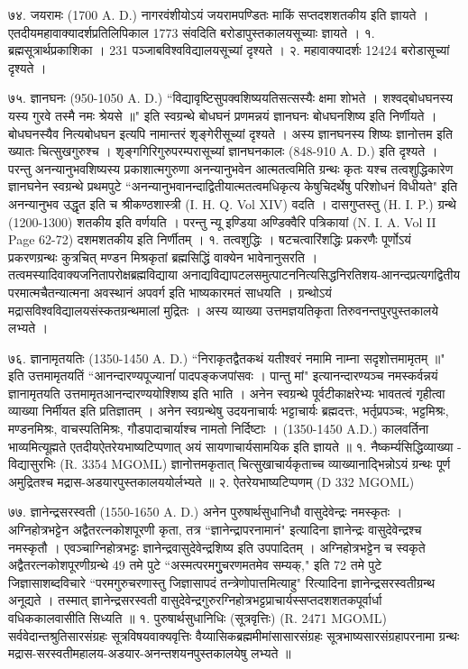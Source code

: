 ७४. जयरामः (1700 A. D.)
नागरवंशीयोऽयं जयरामपण्डितः माकिं सप्तदशशतकीय इति ज्ञायते । एतदीयमहावाक्यादर्शप्रतिलिपिकाल 1773 संवदिति बरोडापुस्तकालयसूच्याः ज्ञायते ।
१. ब्रह्मसूत्रार्थप्रकाशिका । 231 पञ्जाबविश्वविद्यालयसूच्यां दृश्यते ।
२. महावाक्यादर्शः 12424 बरोडासूच्यां दृश्यते ।

७५. ज्ञानघनः (950-1050 A. D.)
``विद्यावृष्टिसुपक्वशिष्ययतिसत्सस्यैः क्षमा शोभते ।
शश्वद्बोधघनस्य यस्य गुरवे तस्मै नमः श्रेयसे ॥"
इति स्वग्रन्थे बोधघनं प्रणमन्नयं ज्ञानघनः बोधघनशिष्य इति निर्णीयते । बोधघनस्यैव नित्यबोधघन इत्यपि नामान्तरं शृङ्गेरीसूच्यां दृश्यते । अस्य ज्ञानघनस्य शिष्यः ज्ञानोत्तम इति ख्यातः चित्सुखगुरुश्च । शृङ्गगिरिगुरुपरम्परासूच्यां ज्ञानघनकालः (848-910 A. D.) इति दृश्यते । परन्तु अनन्यानुभवशिष्यस्य प्रकाशात्मगुरुणा अनन्यानुभवेन आत्मतत्वमिति ग्रन्थः कृतः यश्च तत्वशुद्धिकारेण ज्ञानघनेन स्वग्रन्थे प्रथमपुटे ``अनन्यानुभवानन्दाद्वितीयात्मतत्वमधिकृत्य केषुचिदर्थेषु परिशोधनं विधीयते" इति अनन्यानुभव उद्धृत इति च श्रीकण्ठशास्त्री (I. H. Q. Vol XIV) वदति । दासगुप्तस्तु (H. I. P.) ग्रन्थे (1200-1300) शतकीय इति वर्णयति । परन्तु न्यू इण्डिया अण्डिक्वैरि पत्रिकायां (N. I. A. Vol II Page 62-72) दशमशतकीय इति निर्णीतम् ।
१. तत्वशुद्धिः । षटचत्वारिंशद्धिः प्रकरणैः पूर्णोऽयं प्रकरणग्रन्थः कुत्रचित् मण्डन मिश्रकृतां ब्रह्मसिद्धिं वाक्येन भावेनानुसरति । तत्वमस्यादिवाक्यजनितापरोक्षब्रह्मविद्याया अनाद्यविद्यापटलसमुत्पाटननित्यसिद्धनिरतिशय-आनन्दप्रत्यगद्वितीय परमात्मचैतन्यात्मना अवस्थानं अपवर्ग इति भाष्यकारमतं साधयति । ग्रन्थोऽयं मद्रासविश्वविद्यालयसंस्कतग्रन्थमालां मुद्रितः । अस्य व्याख्या उत्तमज्ञयतिकृता तिरुवनन्तपुरपुस्तकालये लभ्यते ।

७६. ज्ञानामृतयतिः (1350-1450 A. D.)
``निराकृतद्वैतकथं यतीश्वरं नमामि नाम्ना सदृशोत्तमामृतम् ॥" इति उत्तमामृतयतिं ``आनन्दारण्यपूज्यानांं पादपङ्कजपांसवः । पान्तु मां" इत्यानन्दारण्यञ्च नमस्कर्वन्नयं ज्ञानामृतयति उत्तमामृतआनन्दारण्ययोश्शिष्य इति भाति ।
अनेन स्वग्रन्थे पूर्वटीकाक्षरेभ्यः भावतत्वं गृहीत्वा व्याख्या निर्मीयत इति प्रतिज्ञातम् । अनेन स्वग्रन्थेषु उदयनाचार्यः भट्टाचार्यः ब्रह्मदत्तः, भर्तृप्रपञ्चः, भट्टमिश्रः, मण्डनमिश्रः, वाचस्पतिमिश्रः, गौडपादाचार्याश्च नामतो निर्दिष्टाः । (1350-1450 A.D.) कालवर्तिना भाव्यमित्यूह्मते एतदीयऐतरेयभाष्यटिप्पणात् अयं सायणाचार्यसामयिक इति ज्ञायते ॥
१. नैष्कर्म्यसिद्धिव्याख्या - विद्यासुरभिः (R. 3354 MGOML)
ज्ञानोत्तमकृतात् चित्सुखाचार्यकृताच्च व्याख्यानाद्भिन्नोऽयं ग्रन्थः पूर्ण अमुद्रितश्च मद्रास-अडयारपुस्तकालययोर्लभ्यते ॥
२. ऐतरेयभाष्यटिप्पणम् (D 332 MGOML)

७७. ज्ञानेन्द्रसरस्वती (1550-1650 A. D.)
अनेन पुरुषार्थसुधानिधौ वासुदेवेन्द्रः नमस्कृतः । अग्निहोत्रभट्टेन अद्वैतरत्नकोशपूरणी कृता, तत्र ``ज्ञानेन्द्रापरनामानं" इत्यादिना ज्ञानेन्द्रः वासुदेवेन्द्रश्च नमस्कृतौ । एवञ्चाग्निहोत्रभट्टः ज्ञानेन्द्रवासुदेवेन्द्रशिष्य इति उपपादितम् । अग्निहोत्रभट्टेन च स्वकृते अद्वैतरत्नकोशपूरणीग्रन्थे 49 तमे पुटे ``अस्मत्परमगुुचरणमतमेव सम्यक्," इति 72 तमे पुटे जिज्ञासाशब्दविचारे ``परमगुरुचरणास्तु जिज्ञासापदं तन्त्रेणोपात्तमित्याहु" रित्यादिना ज्ञानेन्द्रसरस्वतीग्रन्थ अनूद्यते । तस्मात् ज्ञानेन्द्रसरस्वती वासुदेवेन्द्रगुरुरग्निहोत्रभट्टप्राचार्यस्सप्तदशशतकपूर्वार्धा वधिककालवासीति सिध्यति ॥
१. पुरुषार्थसुधानिधिः (सूत्रवृत्तिः) (R. 2471 MGOML)
सर्ववेदान्तश्रुतिसारसंग्रहः सूत्रविषयवाक्यवृत्तिः वैय्यासिकब्रह्ममीमांसासारसंग्रहः सूत्रभाष्यसारसंग्रहापरनामा ग्रन्थः मद्रास-सरस्वतीमहालय-अडयार-अनन्तशयनपुस्तकालयेषु लभ्यते ॥

